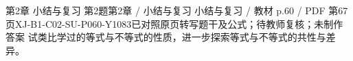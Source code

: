 \par\noindent\begin{minipage}{\linewidth}
\begin{bankitem}{第2章 小结与复习 第2题}{第2章 / 小结与复习 小结与复习 / 教材 p.60 / PDF 第67页}{XJ-B1-C02-SU-P060-Y1083}{已对照原页转写题干及公式；待教师复核；未制作答案}
试类比学过的等式与不等式的性质，进一步探索等式与不等式的共性与差异。
\end{bankitem}
\end{minipage}\par\medskip
